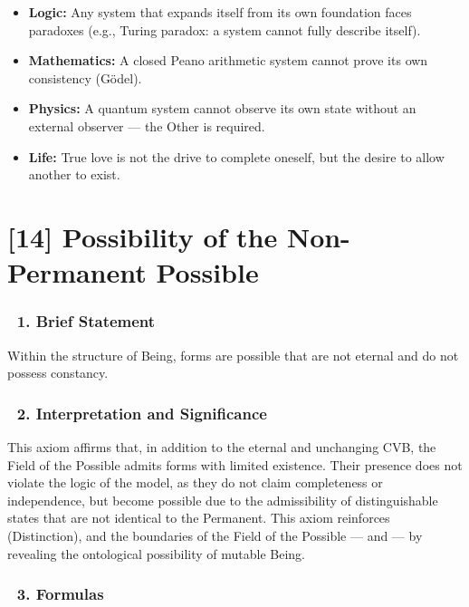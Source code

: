 \documentclass[12pt]{article}
\begin{document}
\begin{itemize}
\item \textbf{Logic:} Any system that expands itself from its own foundation faces paradoxes (e.g., Turing paradox: a system cannot fully describe itself).
\item \textbf{Mathematics:} A closed Peano arithmetic system cannot prove its own consistency (Gödel).
\item \textbf{Physics:} A quantum system cannot observe its own state without an external observer — the Other is required.
\item \textbf{Life:} True love is not the drive to complete oneself, but the desire to allow another to exist.
\end{itemize}





\section*{[14] Possibility of the Non-Permanent Possible}

\subsubsection*{🔹 1. Brief Statement}

Within the structure of Being, forms are possible that are not eternal and do not possess constancy.

\subsubsection*{🔹 2. Interpretation and Significance}

This axiom affirms that, in addition to the eternal and unchanging CVB, the Field of the Possible admits forms with limited existence. Their presence does not violate the logic of the model, as they do not claim completeness or independence, but become possible due to the admissibility of distinguishable states that are not identical to the Permanent. This axiom reinforces \text{[5]} (Distinction), and the boundaries of the Field of the Possible — \text{[4.2]} and \text{[4.3]} — by revealing the ontological possibility of mutable Being.

\subsubsection*{🔹 3. Formulas}
\end{document}
